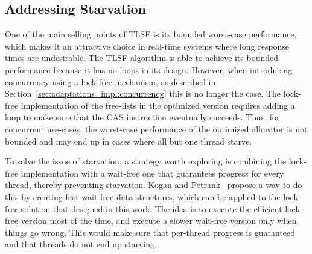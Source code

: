 \subsection{Addressing Starvation}
\label{sec:future-work:starvation}

One of the main selling points of TLSF is its bounded worst-case performance, which makes it an attractive choice in real-time systems where long response times are undesirable. The TLSF algorithm is able to achieve its bounded performance because it has no loops in its design. However, when introducing concurrency using a lock-free mechanism, as described in Section~\ref{sec:adaptations_impl:concurrency} this is no longer the case. The lock-free implementation of the free-lists in the optimized version requires adding a loop to make sure that the CAS instruction eventually succeeds. Thus, for concurrent use-cases, the worst-case performance of the optimized allocator is not bounded and may end up in cases where all but one thread starve. 

To solve the issue of starvation, a strategy worth exploring is combining the lock-free implementation with a wait-free one that guarantees progress for every thread, thereby preventing starvation. Kogan and Petrank~\cite{fast_wait_free} propose a way to do this by creating fast wait-free data structures, which can be applied to the lock-free solution that designed in this work. The idea is to execute the efficient lock-free version most of the time, and execute a slower wait-free version only when things go wrong. This would make sure that per-thread progress is guaranteed and that threads do not end up starving.

